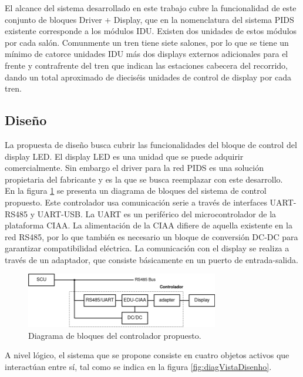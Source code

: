 El alcance del sistema desarrollado en este trabajo cubre la funcionalidad de este conjunto de bloques Driver + Display, que en la nomenclatura del sistema PIDS existente corresponde a los módulos IDU. Existen dos unidades de estos módulos por cada salón. Comunmente un tren tiene siete salones, por lo que se tiene un mínimo de catorce unidades IDU más dos displays externos adicionales para el frente y contrafrente del tren que indican las estaciones cabecera del recorrido, dando un total aproximado de dieciséis unidades de control de display por cada tren.\\


\pagebreak
\subsection{Diseño}
La propuesta de diseño busca cubrir las funcionalidades del bloque de control del display LED. El display LED es una unidad que se puede adquirir comercialmente. Sin embargo el driver para la red PIDS es una solución propietaria del fabricante y es la que se busca reemplazar con este desarrollo.\\

En la figura \ref{fig:diagVistaReDisenhoEduCIAA} se presenta un diagrama de bloques del sistema de control propuesto. Este controlador usa comunicación serie a través de interfaces UART-RS485 y UART-USB. La UART es un periférico del microcontrolador de la plataforma CIAA. La alimentación de la CIAA difiere de aquella existente en la red RS485, por lo que también es necesario un bloque de conversión DC-DC para garantizar compatibilidad eléctrica. La comunicación con el display se realiza a través de un adaptador, que consiste básicamente en un puerto de entrada-salida.\\


\begin{figure}[ht]
	\centering
	\includegraphics[width=0.75\textwidth]{./Figures/diagVistaReDisenhoEduCIAA.png}
	\caption{Diagrama de bloques del controlador propuesto.}
	\label{fig:diagVistaReDisenhoEduCIAA}
\end{figure}

A nivel lógico, el sistema que se propone consiste en cuatro objetos activos que interactúan entre sí, tal como se indica en la figura \ref{fig:diagVistaDisenho}. 

